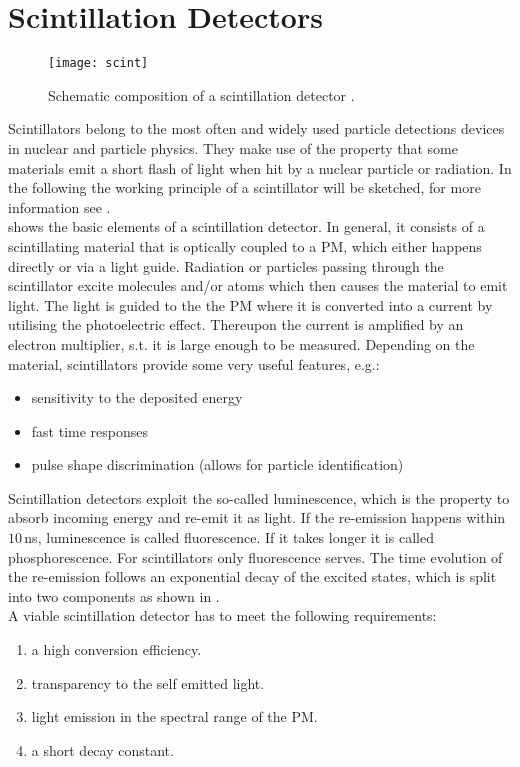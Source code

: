\section{Scintillation Detectors}
\begin{figure}[ht]
	\centering
	\texttt{[image: scint]}
	\caption{Schematic composition of a scintillation detector \cite{leo}.}
	\label{pscint}
\end{figure}\no
Scintillators belong to the most often and widely used particle detections devices in nuclear and particle physics. They make use of the property that some materials emit a short flash of light when hit by a nuclear particle or radiation. In the following the working principle of a scintillator will be sketched, for more information see \cite{leo}.\\
 shows the basic elements of a scintillation detector. In general, it consists of a scintillating material that is optically coupled to a \ac{PM}, which either happens directly or via a light guide. Radiation or particles passing through the scintillator excite molecules and/or atoms which then causes the material to emit light. The light is guided to the the \ac{PM} where it is converted into a current by utilising the photoelectric effect. Thereupon the current is amplified by an electron multiplier, s.t. it is large enough to be measured. Depending on the material, scintillators provide some very useful features, e.g.:
\begin{itemize}
	\item sensitivity to the deposited energy
	\item fast time responses
	\item pulse shape discrimination (allows for particle identification)
\end{itemize}
Scintillation detectors exploit the so-called luminescence, which is the property to absorb incoming energy and re-emit it as light. If the re-emission happens within $10\,$ns, luminescence is called fluorescence. If it takes longer it is called phosphorescence. For scintillators only fluorescence serves. The time evolution of the re-emission follows an exponential decay of the excited states, which is split into two components as shown in .\\
A viable scintillation detector has to meet the following requirements:
\begin{enumerate}
	\item a high conversion efficiency.
	\item transparency to the self emitted light.
	\item light emission in the spectral range of the \ac{PM}.
	\item a short decay constant.
\end{enumerate}
